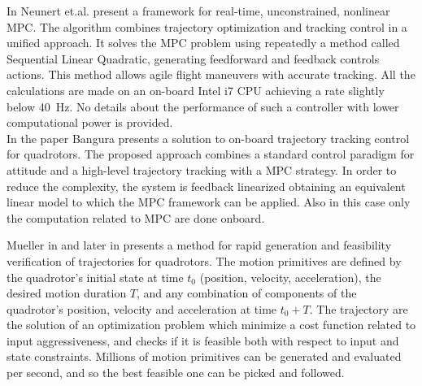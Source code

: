 In \cite{neunertfast} Neunert et.al. present a framework for real-time, unconstrained, nonlinear MPC. The algorithm combines trajectory optimization and tracking control in a unified approach. It solves the MPC problem using repeatedly a method called Sequential Linear Quadratic, generating feedforward and feedback controls actions. This method allows agile flight maneuvers with accurate tracking. All the calculations are made on an on-board Intel i7 CPU achieving a rate slightly below \SI{40}{\Hz}. No details about the performance of such a controller with lower computational power is provided.\\

In the paper \cite{bangura2014real} Bangura presents a solution to on-board trajectory tracking control for quadrotors. The
proposed approach combines a standard control paradigm for attitude and a high-level trajectory tracking with a MPC strategy. 
In order to reduce the complexity, the system is feedback linearized obtaining an equivalent linear model to which the MPC framework can be applied. Also in this case only the computation related to MPC are done onboard.

Mueller in \cite{mueller2013model} and later in \cite{mueller2015computationally} presents a method for rapid generation and feasibility verification of trajectories for quadrotors. The motion primitives are defined by the quadrotor's initial state at time $t_0$ (position, velocity, acceleration), the desired motion duration $T$, and any combination of components of the quadrotor's position, velocity and acceleration at time $t_0+T$. The trajectory are the solution of an optimization problem which minimize a cost function related to input aggressiveness, and checks if it is feasible both with respect to input and state constraints. Millions of motion primitives can be generated and evaluated per second, and so the best feasible one can be picked and followed.\\



